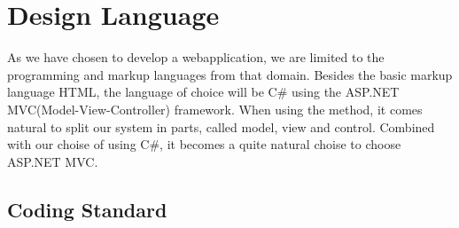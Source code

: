 \section{Design Language}
\label{sec:design_language}

As we have chosen to develop a webapplication, we are limited to the programming and markup languages from that domain.
Besides the basic markup language HTML, the language of choice will be C\# using the ASP.NET MVC(Model-View-Controller) framework. When using the \ooad method, it comes natural to split our system in parts, called model, view and control. Combined with our choise of using C\#, it becomes a quite natural choise to choose ASP.NET MVC.


\subsection{Coding Standard}
\label{subsec:coding_standard}